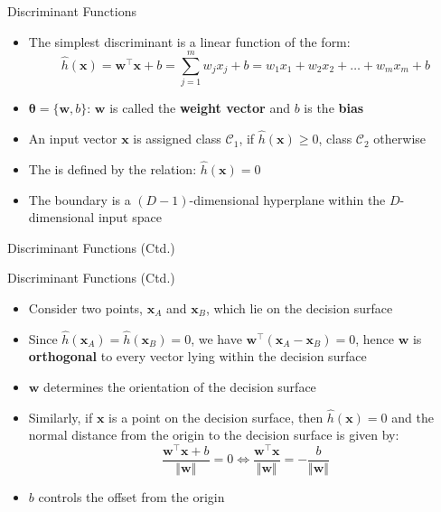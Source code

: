 \begin{frame}{Discriminant Functions}{}
	\begin{itemize}
		\item The simplest discriminant is a linear function of the form:
		\begin{equation}
			\widehat{h}(\bm{x})
				= \bm{w}^{\intercal} \bm{x} + b
				= \sum_{j=1}^m w_j x_j + b
				= w_1 x_1 + w_2 x_2 + \dots + w_m x_m + b
		\end{equation} 
		\item $\bm{\theta} = \{ \bm{w}, b \}$: $\bm{w}$ is called the \textbf{weight vector} and $b$ is the \textbf{bias}
		\item An input vector $\bm{x}$ is assigned class $\mathcal{C}_1$, if $\widehat{h}(\bm{x}) \ge 0$,
			class $\mathcal{C}_2$ otherwise
		\item The  is defined by the relation: $\widehat{h}(\bm{x}) = 0$
		\item The boundary is a $(D - 1)$-dimensional hyperplane within the $D$-dimensional input space
	\end{itemize}
\end{frame}


\begin{frame}{Discriminant Functions (Ctd.)}{}
	\vspace*{-2mm}
	
\end{frame}


\begin{frame}{Discriminant Functions (Ctd.)}{}
	\begin{itemize}
		\item Consider two points, $\bm{x}_A$ and $\bm{x}_B$, which lie on the decision surface
		\item Since $\widehat{h}(\bm{x}_A) = \widehat{h}(\bm{x}_B) = 0$, we have $\bm{w}^{\intercal}(\bm{x}_A - \bm{x}_B) = 0$,
			hence $\bm{w}$ is \textbf{orthogonal} to every vector lying within the decision surface
		\item $\bm{w}$ determines the orientation of the decision surface
		\item Similarly, if $\bm{x}$ is a point on the decision surface, then $\widehat{h}(\bm{x}) = 0$ and the normal distance from the
			origin to the decision surface is given by:
		\begin{equation}
			\frac{\bm{w}^{\intercal} \bm{x} + b}{\Vert \bm{w} \Vert} = 0
			\Leftrightarrow
			\frac{\bm{w}^{\intercal} \bm{x}}{\Vert \bm{w} \Vert} = -\frac{b}{\Vert \bm{w} \Vert}
		\end{equation}
		\item $b$ controls the offset from the origin
	\end{itemize}
\end{frame}


